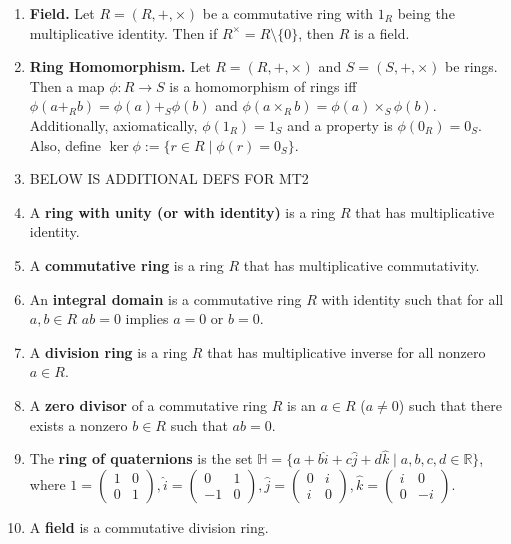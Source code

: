 \begin{enumerate}
	\item \textbf{Field. } Let $R = (R,+,\times)$ be a commutative ring with $1_R$ being the multiplicative identity. Then if $R^\times = R \setminus \{0\}$, then $R$ is a field. 
	\item \textbf{Ring Homomorphism. } Let $R = (R,+,\times)$ and $S=(S,+,\times)$ be rings. Then a map $\phi: R \to S$ is a homomorphism of rings iff $\phi(a +_R b) = \phi(a) +_S \phi(b)$ and $\phi(a \times_R b) = \phi(a) \times_S \phi(b)$. Additionally, axiomatically, $\phi(1_R)=1_S$ and a property is $\phi(0_R) = 0_S$. Also, define $\ker\phi := \{r \in R \mid \phi(r) = 0_S\}$. 
	\item BELOW IS ADDITIONAL DEFS FOR MT2
	\item A \textbf{ring with unity (or with identity)} is a ring $R$ that has multiplicative identity. 
        \item A \textbf{commutative ring} is a ring $R$ that has multiplicative commutativity. 
        \item An \textbf{integral domain} is a commutative ring $R$ with identity such that for all $a,b \in R$ $ab=0$ implies $a=0$ or $b=0$. 
        \item A \textbf{division ring} is a ring $R$ that has multiplicative inverse for all nonzero $a \in R$. 
        \item A \textbf{zero divisor} of a commutative ring $R$ is an $a \in R$ ($a \neq 0$) such that there exists a nonzero $b \in R$ such that $ab=0$. 
        \item The \textbf{ring of quaternions} is the set $\mathbb{H} = \{a + b\hat{i} + c\hat{j} + d\hat{k} \mid a,b,c,d \in \mathbb{R}\}$, where $1 = \begin{pmatrix}
            1 & 0 \\
            0 & 1
        \end{pmatrix}, \hat{i} = \begin{pmatrix}
            0 & 1 \\
            -1 & 0
        \end{pmatrix}, \hat{j} = \begin{pmatrix}
            0 & i \\
            i & 0
        \end{pmatrix}, \hat{k} = \begin{pmatrix}
            i & 0 \\
            0 & -i
        \end{pmatrix}.$
	\item A \textbf{field} is a commutative division ring. 

\end{enumerate}

